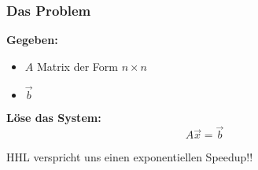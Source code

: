     \begin{frame}
        \frametitle{Das Problem}

        \textbf{Gegeben:}
        \begin{itemize}
            \item $A$ Matrix der Form $n \times n$
            \item $\vec{b}$
       \end{itemize}

       \hfill

       \textbf{Löse das System:}
        $$A \vec{x} = \vec{b}$$


       \hfill

        HHL verspricht uns einen exponentiellen Speedup!!

    \end{frame}


        
